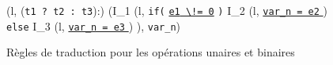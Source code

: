 \begin{figure*}[bt]
{    {
      {
        (l, (\mbox{\lstinline't1 ? t2 : t3'}):)
        (I_1
        \concat (l,
        \mbox{\lstinline'if('}
        \underline{\mbox{\lstinline'e1'}\Zclear \mbox{\lstinline' \!= 0'}}
        \mbox{\lstinline')'} \bopen
        I_2
        \concat
        (l, \underline{\Zinit \mbox{\lstinline'var_n = e2'} \Zclear}
        \semicolon )
        \bclose
        \mbox{\lstinline'else'} \bopen
        I_3
        \concat
        (l, \underline{\Zinit \mbox{\lstinline'var_n = e3'} \Zclear}
        \semicolon )
        \bclose ),
        \mbox{\lstinline'var_n'})
      }
    }
  }
  \caption{Règles de traduction pour les opérations unaires et binaires}
  \label{fig:op}
\end{figure*}

